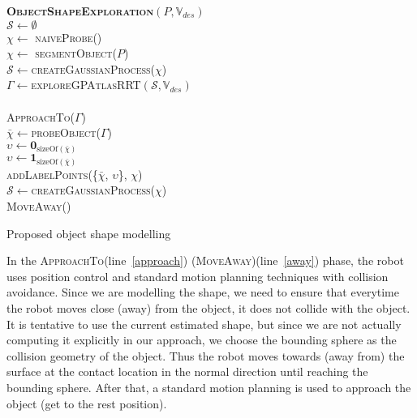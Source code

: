 \begin{algorithm}[h]
\textbf{\textsc{ObjectShapeExploration}}$(P, \mathbb{V}_{des})$\\ %
\LinesNumbered
\DontPrintSemicolon
\SetAlgoVlined {} 
  $\mathcal{S} \leftarrow \emptyset$ \\
  {
    $\chi \leftarrow $ \textsc{naiveProbe}() \\
  }
  \Else
  {
    $\chi \leftarrow $ \textsc{segmentObject}($P$) \\
  }
  $\mathcal{S} \leftarrow $\textsc{createGaussianProcess}($\chi$) \\
  {
    $\Gamma \leftarrow $\textsc{exploreGPAtlasRRT}$(\mathcal{S}, \mathbb{V}_{des})$ \label{exploration} \\
    \If{ $\Gamma = \emptyset$ }
    {
       \label{solutionfound} \label{end} \\
    }
    \Else
    {
      \textsc{ApproachTo}($\Gamma$) \label{approach} \\
      $\bar{\chi} \leftarrow $\textsc{probeObject}($\Gamma$) \label{probe} \\
      {
        $\upsilon \leftarrow \mathbf{0}_{\text{sizeOf}(\bar{\chi})}$  \label{belonglabel} \\
      }
      \Else
      {
        $\upsilon \leftarrow \mathbf{1}_{\text{sizeOf}(\bar{\chi})}$ \label{nobelonglabel} \\
      }
      \textsc{addLabelPoints}(\{$\bar{\chi}$, $\upsilon$\}, $\chi$) \\
      $\mathcal{S} \leftarrow $\textsc{createGaussianProcess}($\chi$) \\
      \textsc{MoveAway}() \label{away} \\
    }
  }
\caption{Proposed object shape modelling} \label{alg:strategy}
\end{algorithm}

In the \textsc{ApproachTo}(line~\ref{approach}) (\textsc{MoveAway})(line~\ref{away}) phase, the robot uses position control and standard motion planning techniques with collision avoidance. Since we are modelling the shape, we need to ensure that everytime the robot moves close (away) from the object, it does not collide with the object. It is tentative to use the current estimated shape, but since we are not actually computing it explicitly in our approach, we choose the bounding sphere as the collision geometry of the object. Thus the robot moves towards (away from) the surface at the contact location in the normal direction until reaching the bounding sphere. After that, a standard motion planning is used to approach the object (get to the rest position).

